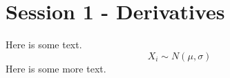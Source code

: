 \documentclass{article}
\begin{document}
\section{Session 1 - Derivatives}
Here is some text.
\begin{equation}
    X_{i} \sim N(\mu, \sigma)
\end{equation}
Here is some more text. 
\end{document}
